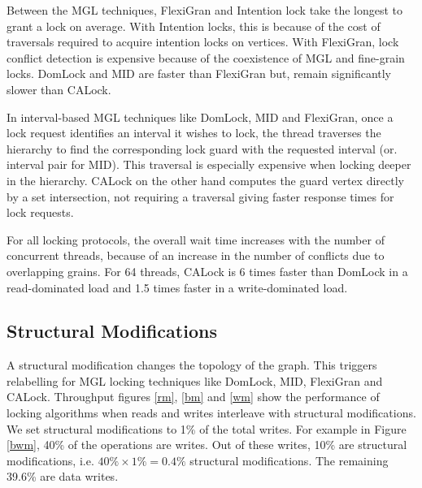 Between the MGL techniques, FlexiGran and Intention lock take the longest to grant a lock on average. With Intention locks, this is because of the cost of traversals required to acquire intention locks on vertices. With FlexiGran, lock conflict detection is expensive because of the coexistence of MGL and fine-grain locks. DomLock and MID are faster than FlexiGran but, remain significantly slower than CALock. 

In interval-based MGL techniques like DomLock, MID and FlexiGran, once a lock request identifies an interval it wishes to lock, the thread traverses the hierarchy to find the corresponding lock guard with the requested interval (or. interval pair for MID). This traversal is especially expensive when locking deeper in the hierarchy. CALock on the other hand computes the guard vertex directly by a set intersection, not requiring a traversal giving faster response times for lock requests. 

For all locking protocols, the overall wait time increases with the number of concurrent threads, because of an increase in the number of conflicts due to overlapping grains. For 64 threads, CALock is 6 times faster than DomLock in a read-dominated load and 1.5 times faster in a write-dominated load.







	



\subsection{Structural Modifications} \label{benchmark:DynamicOverallPerf}

A structural modification changes the topology of the graph. This triggers relabelling for MGL locking techniques like DomLock, MID, FlexiGran and CALock. 
Throughput figures \ref{rm}, \ref{bm} and \ref{wm} show the performance of locking algorithms when reads and writes interleave with structural modifications.
We set structural modifications to 1\% of the total writes.
For example in Figure \ref{bwm}, 40\% of the operations are writes. Out of these writes, 10\% are structural modifications, i.e. $40\% \times 1\%  = 0.4\%$ structural modifications. The remaining 39.6\% are data writes.


